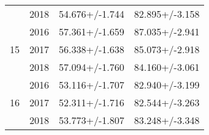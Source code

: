 \begin{table}
\begin{tabular}{cccc}
   & 2018 &       54.676+/-1.744 &        82.895+/-3.158 \\
\cline{1-4}
\multirow{3}{*}{15} & 2016 &       57.361+/-1.659 &        87.035+/-2.941 \\
   & 2017 &       56.338+/-1.638 &        85.073+/-2.918 \\
   & 2018 &       57.094+/-1.760 &        84.160+/-3.061 \\
\cline{1-4}
\multirow{3}{*}{16} & 2016 &       53.116+/-1.707 &        82.940+/-3.199 \\
   & 2017 &       52.311+/-1.716 &        82.544+/-3.263 \\
   & 2018 &       53.773+/-1.807 &        83.248+/-3.348 \\
\bottomrule
\end{tabular}
\end{table}
